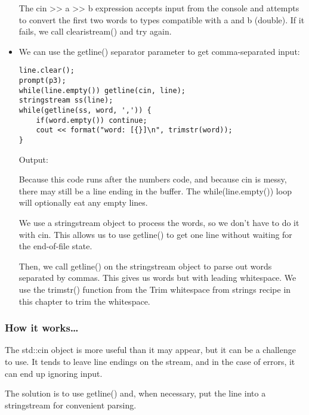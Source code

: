 \begin{itemize}
The cin >{}> a >{}> b expression accepts input from the console and attempts to convert the first two words to types compatible with a and b (double). If it fails, we call clearistream() and try again.

\item 
We can use the getline() separator parameter to get comma-separated input:

\begin{lstlisting}[style=styleCXX]
line.clear();
prompt(p3);
while(line.empty()) getline(cin, line);
stringstream ss(line);
while(getline(ss, word, ',')) {
	if(word.empty()) continue;
	cout << format("word: [{}]\n", trimstr(word));
}
\end{lstlisting}

Output:


Because this code runs after the numbers code, and because cin is messy, there may still be a line ending in the buffer. The while(line.empty()) loop will optionally eat any empty lines.

We use a stringstream object to process the words, so we don't have to do it with cin. This allows us to use getline() to get one line without waiting for the end-of-file state.

Then, we call getline() on the stringstream object to parse out words separated by commas. This gives us words but with leading whitespace. We use the trimstr() function from the Trim whitespace from strings recipe in this chapter to trim the whitespace.
\end{itemize}

\subsubsection{How it works…}


The std::cin object is more useful than it may appear, but it can be a challenge to use. It tends to leave line endings on the stream, and in the case of errors, it can end up ignoring input.

The solution is to use getline() and, when necessary, put the line into a stringstream for convenient parsing.











